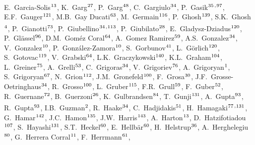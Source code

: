 \begin{flushleft}
E.~Garcia-Solis$^\textrm{\scriptsize 13}$,
K.~Garg$^\textrm{\scriptsize 27}$,
P.~Garg$^\textrm{\scriptsize 48}$,
C.~Gargiulo$^\textrm{\scriptsize 34}$,
P.~Gasik$^\textrm{\scriptsize 35}$\textsuperscript{,}$^\textrm{\scriptsize 97}$,
E.F.~Gauger$^\textrm{\scriptsize 121}$,
M.B.~Gay Ducati$^\textrm{\scriptsize 63}$,
M.~Germain$^\textrm{\scriptsize 116}$,
P.~Ghosh$^\textrm{\scriptsize 139}$,
S.K.~Ghosh$^\textrm{\scriptsize 4}$,
P.~Gianotti$^\textrm{\scriptsize 73}$,
P.~Giubellino$^\textrm{\scriptsize 34}$\textsuperscript{,}$^\textrm{\scriptsize 113}$,
P.~Giubilato$^\textrm{\scriptsize 28}$,
E.~Gladysz-Dziadus$^\textrm{\scriptsize 120}$,
P.~Gl\"{a}ssel$^\textrm{\scriptsize 96}$,
D.M.~Gom\'{e}z Coral$^\textrm{\scriptsize 64}$,
A.~Gomez Ramirez$^\textrm{\scriptsize 59}$,
A.S.~Gonzalez$^\textrm{\scriptsize 34}$,
V.~Gonzalez$^\textrm{\scriptsize 10}$,
P.~Gonz\'{a}lez-Zamora$^\textrm{\scriptsize 10}$,
S.~Gorbunov$^\textrm{\scriptsize 41}$,
L.~G\"{o}rlich$^\textrm{\scriptsize 120}$,
S.~Gotovac$^\textrm{\scriptsize 119}$,
V.~Grabski$^\textrm{\scriptsize 64}$,
L.K.~Graczykowski$^\textrm{\scriptsize 140}$,
K.L.~Graham$^\textrm{\scriptsize 104}$,
L.~Greiner$^\textrm{\scriptsize 75}$,
A.~Grelli$^\textrm{\scriptsize 53}$,
C.~Grigoras$^\textrm{\scriptsize 34}$,
V.~Grigoriev$^\textrm{\scriptsize 76}$,
A.~Grigoryan$^\textrm{\scriptsize 1}$,
S.~Grigoryan$^\textrm{\scriptsize 67}$,
N.~Grion$^\textrm{\scriptsize 112}$,
J.M.~Gronefeld$^\textrm{\scriptsize 100}$,
F.~Grosa$^\textrm{\scriptsize 30}$,
J.F.~Grosse-Oetringhaus$^\textrm{\scriptsize 34}$,
R.~Grosso$^\textrm{\scriptsize 100}$,
L.~Gruber$^\textrm{\scriptsize 115}$,
F.R.~Grull$^\textrm{\scriptsize 59}$,
F.~Guber$^\textrm{\scriptsize 52}$,
R.~Guernane$^\textrm{\scriptsize 72}$,
B.~Guerzoni$^\textrm{\scriptsize 26}$,
K.~Gulbrandsen$^\textrm{\scriptsize 84}$,
T.~Gunji$^\textrm{\scriptsize 131}$,
A.~Gupta$^\textrm{\scriptsize 93}$,
R.~Gupta$^\textrm{\scriptsize 93}$,
I.B.~Guzman$^\textrm{\scriptsize 2}$,
R.~Haake$^\textrm{\scriptsize 34}$,
C.~Hadjidakis$^\textrm{\scriptsize 51}$,
H.~Hamagaki$^\textrm{\scriptsize 77}$\textsuperscript{,}$^\textrm{\scriptsize 131}$,
G.~Hamar$^\textrm{\scriptsize 142}$,
J.C.~Hamon$^\textrm{\scriptsize 135}$,
J.W.~Harris$^\textrm{\scriptsize 143}$,
A.~Harton$^\textrm{\scriptsize 13}$,
D.~Hatzifotiadou$^\textrm{\scriptsize 107}$,
S.~Hayashi$^\textrm{\scriptsize 131}$,
S.T.~Heckel$^\textrm{\scriptsize 60}$,
E.~Hellb\"{a}r$^\textrm{\scriptsize 60}$,
H.~Helstrup$^\textrm{\scriptsize 36}$,
A.~Herghelegiu$^\textrm{\scriptsize 80}$,
G.~Herrera Corral$^\textrm{\scriptsize 11}$,
F.~Herrmann$^\textrm{\scriptsize 61}$,

\end{flushleft}
